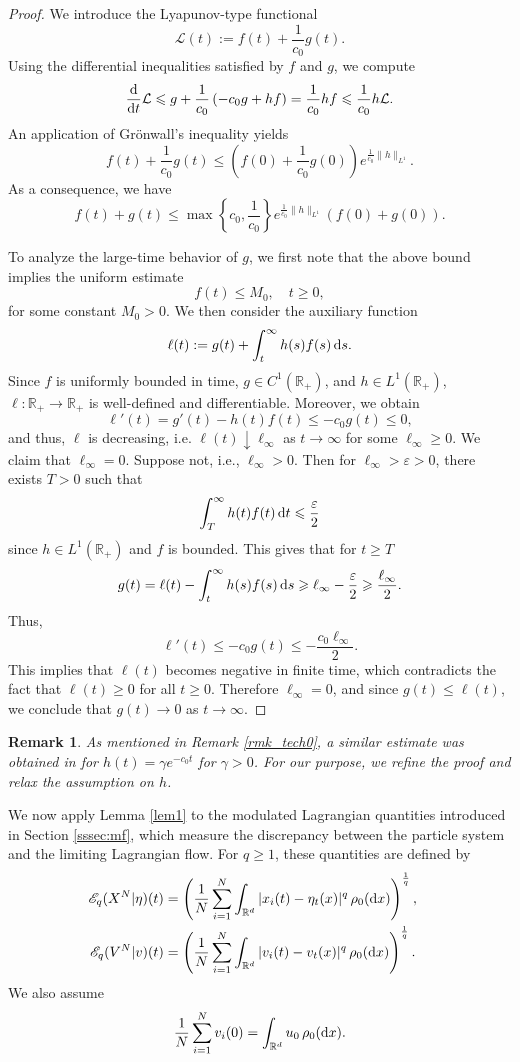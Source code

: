 \documentclass[10pt,reqno]{amsart}
\renewcommand{\geq}{\geqslant}
\renewcommand{\ge}{\geqslant}
\renewcommand{\leq}{\leqslant}
\renewcommand{\le}{\leqslant}
\numberwithin{equation}{section}
\newtheorem{remark}{Remark}[section]
\newcommand{\R}{\mathbb R}
\newcommand{\e}{\varepsilon}
\newcommand{\lt}{\left}
\newcommand{\rt}{\right}
\newcommand{\intr}{\int_{\R^d}}
\newcommand{\calL}{\mathcal L}
\newcommand{\rd}{\textnormal{d}}
\newcommand{\dx}{\textnormal{d}x}
\newcommand{\dt}{\textnormal{d}t}
\newcommand{\ds}{\textnormal{d}s}
\begin{document}
\begin{proof}We introduce the Lyapunov-type functional
\[
\calL (t) := f(t) + \frac{1}{c_0}g(t).
\]
Using the differential inequalities satisfied by $f$ and $g$, we compute
\[
\frac{\rd}{\dt}\calL \leq g+\frac{1}{c_0}  \lt(-c_0 g+h f\rt) =\frac{1}{c_0} hf \leq \frac{1}{c_0} h\calL.
\]
An application of Gr\"onwall's inequality yields
\[
f(t) + \frac1{c_0}g(t) \leq \lt( f(0) + \frac1{c_0}g(0)\rt)e^{\frac1{c_0}\|h\|_{L^1}}.
\]
As a consequence, we have
\[
f(t) + g(t) \leq \max\lt\{c_0, \frac1{c_0}\rt\}e^{\frac1{c_0}\|h\|_{L^1}}\lt(f(0) + g(0)\rt).
\]
 
To analyze the large-time behavior of $g$, we first note that the above bound implies the uniform estimate
\[
f(t) \leq M_0, \quad t \geq 0,
\]
for some constant $M_0>0$. We then consider the auxiliary function
\[
\ell(t) := g(t) + \int_t^\infty h(s) f(s) \,\ds. 
\]
Since $f$ is uniformly bounded in time, $g \in C^1(\R_+)$, and $h \in L^1(\R_+)$, $\ell:\R_+ \to \R_+$ is well-defined and differentiable. Moreover, we obtain
\[
\ell'(t) = g'(t) - h(t) f(t) \leq -c_0 g(t) \leq 0,
\]
and thus, $\ell$ is decreasing, i.e. $\ell(t) \downarrow \ell_\infty$ as $t \to \infty$ for some $\ell_\infty \geq 0$. We claim that $\ell_\infty = 0$. Suppose not, i.e., $\ell_\infty > 0$. Then for $ \ell_\infty > \e >0$, there exists $T >0$ such that
\[
\int_T^\infty h(t) f(t) \,\dt \leq \frac\e2
\]
since $h\in L^1(\R_+)$ and $f$ is bounded. This gives that for $t \geq T$
\[
g(t) = \ell(t) - \int_t^\infty h(s) f(s) \,\ds \ge \ell_\infty - \frac\e2 \ge \frac{\ell_\infty}2.
\]
Thus,
\[
\ell'(t) \leq -c_0 g(t)  \leq - \frac{c_0 \ell_\infty}{2}.
\]
This implies that $\ell(t)$ becomes negative in finite time, which contradicts the fact that $\ell(t)\ge0$ for all $t\ge0$. Therefore $\ell_\infty=0$, and since $g(t)\le \ell(t)$, we conclude that $g(t)\to0$ as $t\to\infty$.
\end{proof}

\begin{remark}%
As mentioned in Remark \ref{rmk_tech0}, a similar estimate was obtained  in \cite[Lemma 3.1]{HKZ18} for $h(t) = \gamma e^{-c_0 t}$ for $\gamma > 0$. For our purpose, we refine the proof and relax the assumption on $h$.
\end{remark}

We now apply Lemma \ref{lem1} to the modulated Lagrangian quantities introduced in Section \ref{sssec:mf}, which measure the discrepancy between the particle system and the limiting Lagrangian flow. For $q\ge1$, these quantities are defined by
\begin{align*}
\mathscr{E}_q(X^N|\eta)(t)  &= \lt( \frac1N\sum_{i=1}^N \intr |x_i(t) - \eta_t(x)|^q \,\rho_0(\dx)\rt)^\frac1q, \cr
\mathscr{E}_q(V^N|v)(t) &= \lt(\frac1N\sum_{i=1}^N \intr |v_i(t) - v_t(x)|^q \,\rho_0(\dx)\rt)^\frac1q.
\end{align*}
We also assume 
\[
\frac1N \sum_{i=1}^N v_i(0) = \intr  u_0\,\rho_0(\dx).
\]
  
\end{document}
